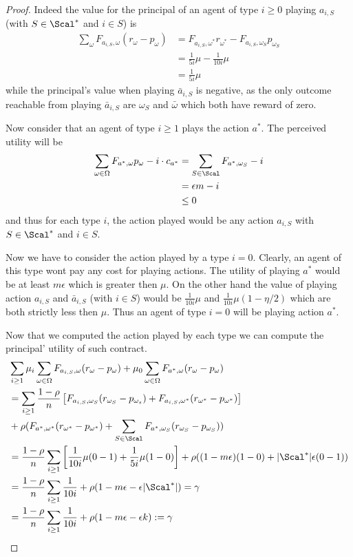 \begin{proof}
	
	Indeed the value for the principal of an agent of type $i\ge 0$ playing $a_{i,S}$ (with $S\in \Scal^*$ and $i\in S$) is
	\begin{align}
		\sum_{\omega} F_{a_{i,S},\omega}(r_\omega-p_\omega)&=F_{a_{i,S},\omega^*}r_{\omega^*}-F_{a_{i,S},\omega_S}p_{\omega_S}\\
		&=\frac{1}{5i}\mu-\frac{1}{10i}\mu\\
		&=\frac{1}{5i}\mu
	\end{align}
	while the principal's value when playing $\bar a_{i, S}$ is negative, as the only outcome reachable from playing $\bar a_{i, S}$ are $\omega_S$ and $\bar \omega$ which both have reward of zero.
	
	Now consider that an agent of type $i\ge 1$ plays the action $a^*$. The perceived utility will be
	\begin{align}
		\sum_{\omega\in \Omega} F_{a^*,\omega}p_\omega - i\cdot c_{a^*} & = \sum_{S\in \Scal} F_{a^*,\omega_S} - i\\
		&=\epsilon m - i\\
		&\le 0
	\end{align}
	and thus for each type $i$, the action played would be any action $a_{i,S}$ with $S\in\Scal^*$ and $i\in S$.
	
	Now we have to consider the action played by a type $i=0$. Clearly, an agent of this type wont pay any cost for playing actions. The utility of playing $a^*$ would be at least $m\epsilon$ which is greater then $\mu$. On the other hand the value of playing action $a_{i, S}$ and $\bar a_{i,S}$ (with $i\in S$) would be $\frac{1}{10i}\mu$ and $\frac{1}{10i}\mu(1-\eta/2)$ which are both strictly less then $\mu$. Thus an agent of type $i=0$ will be playing action $a^*$.
	
	Now that we computed the action played by each type we can compute the principal' utility of such contract.
	\begin{align}
		&\sum_{i\ge 1} \mu_i \sum_{\omega\in\Omega}F_{a_{i, S},\omega}(r_\omega-p_\omega) + \mu_0 \sum_{\omega\in\Omega }F_{a^*,\omega}(r_\omega - p_\omega)\\
		&=\sum_{i\ge 1} \frac{1-\rho}{n} \left[F_{a_{i,S},\omega_S}(r_{\omega_S}-p_{\omega_s})+F_{a_{i,S},\omega^*}(r_{\omega^*}-p_{\omega^*})\right]
		 \\
		 &+ \rho(F_{a^*,\omega^*}(r_{\omega^*}-p_{\omega^*})+\sum_{S\in\Scal}F_{a^*,\omega_S}(r_{\omega_S}-p_{\omega_S}))\\
		 &=\frac{1-\rho}{n}\sum_{i\ge 1}\left[\frac{1}{10i}\mu(0-1)+\frac{1}{5i}\mu(1-0)\right]+\rho((1-m\epsilon)(1-0)+|\Scal^*|\epsilon(0-1))\\
		&=\frac{1-\rho}{n} \sum_{i\ge 1} \frac{1}{10i}+\rho(1-m\epsilon-\epsilon|\Scal^*|)=\gamma\\
		&=\frac{1-\rho}{n} \sum_{i\ge 1}\frac{1}{10i}+\rho(1-m\epsilon-\epsilon k):=\gamma
	\end{align}
	

\end{proof}
